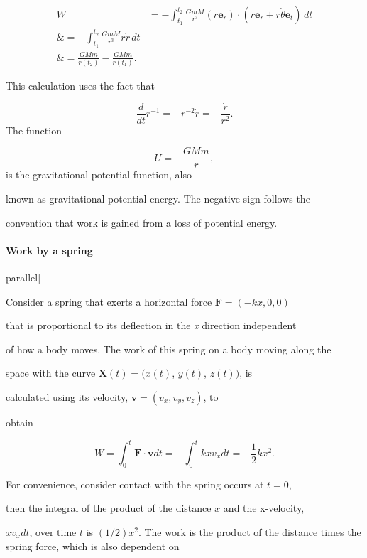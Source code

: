 \begin{align}
W &= -\int^{t _2} _{t _1}\frac{GmM}{r^3}(r\mathbf{e} _r)\cdot(\dot{r}\mathbf{e} _r + r\dot{\theta}\mathbf{e} _t)\,dt \\\&= -\int^{t _2} _{t _1}\frac{GmM}{r^3}r\dot{r}\,dt \\\&= \frac{GMm}{r(t _2)} - \frac{GMm}{r(t _1)}.
\end{align}



This calculation uses the fact that



$$\frac{d}{dt}r^{-1}=-r^{-2}\dot{r}=-\frac{\dot{r}}{r^2}.$$ The function



$$U=-\frac{GMm}{r},$$ is the gravitational potential function, also

known as gravitational potential energy. The negative sign follows the

convention that work is gained from a loss of potential energy.



\paragraph{Work by a spring}




parallel]



Consider a spring that exerts a horizontal force $\mathbf{F} = (-kx, 0, 0)$

that is proportional to its deflection in the \textit{x} direction independent

of how a body moves. The work of this spring on a body moving along the

space with the curve $\mathbf{X}(t) = (x(t)$, $y(t)$, $z(t))$, is

calculated using its velocity, $\mathbf{v} = (v _x, v _y, v _z)$, to

obtain



$$W=\int _0^t\mathbf{F}\cdot\mathbf{v}dt =-\int _0^tkx v_x dt = -\frac{1}{2}kx^2.$$

For convenience, consider contact with the spring occurs at $t = 0$,

then the integral of the product of the distance $x$ and the x-velocity,

$xv _x dt$, over time $t$ is $(1/2)x^2$. The work is the product of the distance times the spring force, which is also dependent on

